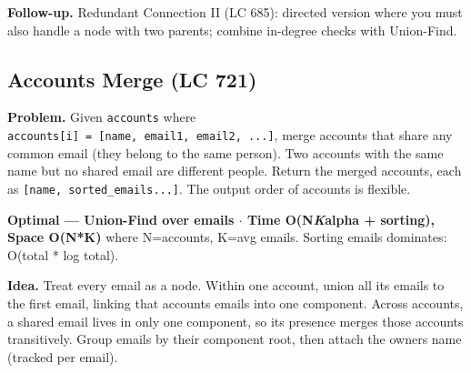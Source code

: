 \documentclass[11pt]{article}
\begin{document}
\textbf{Follow-up.} Redundant Connection II (LC 685): directed version where you must also handle a node with two parents; combine in-degree checks with Union-Find.

\subsection{Accounts Merge (LC 721)}\label{accounts-merge-lc-721}

\textbf{Problem.} Given \texttt{accounts} where \texttt{accounts{[}i{]}\ =\ {[}name,\ email1,\ email2,\ ...{]}}, merge accounts that share any common email (they belong to the same person). Two accounts with the same name but no shared email are different people. Return the merged accounts, each as \texttt{{[}name,\ sorted\_emails...{]}}. The output order of accounts is flexible.

\textbf{Optimal --- Union-Find over emails \(\cdot\) Time O(N\emph{K}alpha + sorting), Space O(N*K)} where N=accounts, K=avg emails. Sorting emails dominates: O(total * log total).

\textbf{Idea.} Treat every email as a node. Within one account, union all its emails to the first email, linking that account\textquotesingle s emails into one component. Across accounts, a shared email lives in only one component, so its presence merges those accounts transitively. Group emails by their component root, then attach the owner\textquotesingle s name (tracked per email).

\end{document}
